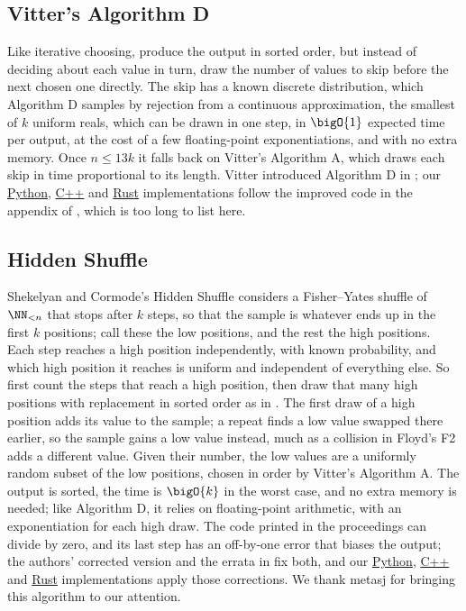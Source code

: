 \documentclass[letterpaper,11pt]{article}
\newcommand{\repo}[2]{\href{https://github.com/ciphergoth/sansreplace/blob/paper_v1/#1}{#2}}
\newcommand{\impls}[1]{\repo{python/algorithms/#1.py}{Python},
  \repo{cpp/#1.cpp}{C++} and \repo{rust/src/algorithms/#1.rs}{Rust}}
\begin{document}
\subsection{Vitter's Algorithm D}
Like iterative choosing, produce the output in sorted order, but
instead of deciding about each value in turn, draw the number of values
to skip before the next chosen one directly. The skip has a known
discrete distribution, which Algorithm D samples by rejection from a
continuous approximation, the smallest of \(k\) uniform reals, which can
be drawn in one step, in \(\bigO{1}\) expected time per
output, at the cost of a few floating-point exponentiations, and with
no extra memory. Once \(n \leq 13k\) it falls back on Vitter's
Algorithm A, which draws each skip in time proportional to its length.
Vitter introduced Algorithm D in \cite{vitterfaster}; our
\impls{vitterd} implementations follow the improved code in the appendix of
\cite{vitterD}, which is too long to list here.

\subsection{Hidden Shuffle}
Shekelyan and Cormode's Hidden Shuffle \cite{hiddenshuffle} considers
a Fisher--Yates shuffle of \(\NN_{<n}\) that stops after \(k\) steps,
so that the sample is whatever ends up in the first \(k\) positions;
call these the low positions, and the rest the high positions. Each
step reaches a high position independently, with known probability,
and which high position it reaches is uniform and independent of
everything else. So first count the steps that reach a high position,
then draw that many high positions with replacement in sorted order as
in \cite{bentleysaxe}. The first draw of a high position adds its value
to the sample; a repeat finds a low value swapped there earlier, so the
sample gains a low value instead, much as a collision in Floyd's F2
adds a different value. Given their number, the low values are a
uniformly random subset of the low positions, chosen in order by
Vitter's Algorithm A. The output is sorted, the time is \(\bigO{k}\) in
the worst case, and no extra memory is needed; like Algorithm D, it
relies on floating-point arithmetic, with an exponentiation for each
high draw. The code printed in the proceedings
\cite{hiddenshuffleproc} can divide by zero, and its last step has an
off-by-one error that biases the output; the authors' corrected version
and the errata in \cite{sampleiterator} fix both, and our
\impls{hiddenshuffle} implementations apply those corrections. We thank metasj for bringing this algorithm to
our attention.
\end{document}
